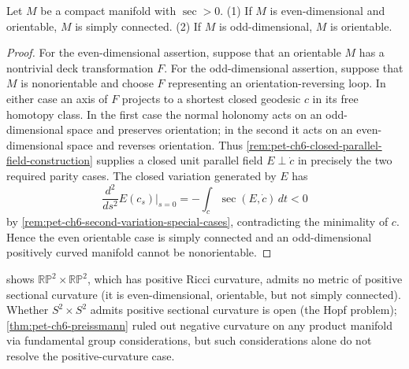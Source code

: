 \begin{theorem}
  \label{thm:pet-ch6-synge-theorem}


  Let $M$ be a compact manifold with $\sec>0$. (1) If $M$ is even-dimensional
  and orientable, $M$ is simply connected. (2) If $M$ is odd-dimensional,
  $M$ is orientable.
\end{theorem}
\begin{proof}
  \sketch
  For the even-dimensional assertion, suppose that an orientable $M$ has a
  nontrivial deck transformation $F$. For the odd-dimensional assertion,
  suppose that $M$ is nonorientable and choose $F$ representing an
  orientation-reversing loop. In either case an axis of $F$ projects to a
  shortest closed geodesic $c$ in its free homotopy class. In the first case
  the normal holonomy acts on an odd-dimensional space and preserves
  orientation; in the second it acts on an even-dimensional space and reverses
  orientation. Thus \cref{rem:pet-ch6-closed-parallel-field-construction}
  supplies a closed unit parallel field $E\perp\dot c$ in precisely the two
  required parity cases. The closed variation generated by $E$ has
  \[
    \frac{d^2}{ds^2}E(c_s)\bigg|_{s=0}
      =-\int_c\sec(E,\dot c)\,dt<0
  \]
  by \cref{rem:pet-ch6-second-variation-special-cases}, contradicting the
  minimality of $c$. Hence the even orientable case is simply connected and an
  odd-dimensional positively curved manifold cannot be nonorientable.
\end{proof}

\begin{remark}
  \label{rem:pet-ch6-hopf-problem}

   shows $\mathbb{RP}^2\times\mathbb{RP}^2$, which has
  positive Ricci curvature, admits no metric of positive sectional curvature
  (it is even-dimensional, orientable, but not simply connected). Whether
  $S^2\times S^2$ admits positive sectional curvature is open (the Hopf
  problem); \cref{thm:pet-ch6-preissmann} ruled out negative curvature on any
  product manifold via fundamental group considerations, but such
  considerations alone do not resolve the positive-curvature case.
\end{remark}


